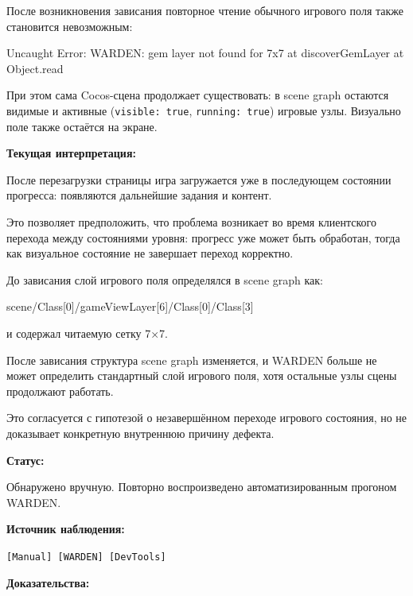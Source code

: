 \documentclass{ZGJournalArticle_2026}
\newenvironment{Shaded}{}{}
\newcommand{\NormalTok}[1]{#1}
\begin{document}
После возникновения зависания повторное чтение обычного игрового поля
также становится невозможным:

\begin{Shaded}
\begin{Highlighting}[]
\NormalTok{Uncaught Error: WARDEN: gem layer not found for 7x7}
\NormalTok{    at discoverGemLayer}
\NormalTok{    at Object.read}
\end{Highlighting}
\end{Shaded}

При этом сама Cocos-сцена продолжает существовать: в scene graph
остаются видимые и активные (\texttt{visible:\ true},
\texttt{running:\ true}) игровые узлы. Визуально поле также остаётся на
экране.

\textbf{Текущая интерпретация:}

После перезагрузки страницы игра загружается уже в последующем состоянии
прогресса: появляются дальнейшие задания и контент.

Это позволяет предположить, что проблема возникает во время клиентского
перехода между состояниями уровня: прогресс уже может быть обработан,
тогда как визуальное состояние не завершает переход корректно.

До зависания слой игрового поля определялся в scene graph как:

\begin{Shaded}
\begin{Highlighting}[]
\NormalTok{scene/Class[0]/gameViewLayer[6]/Class[0]/Class[3]}
\end{Highlighting}
\end{Shaded}

и содержал читаемую сетку 7×7.

После зависания структура scene graph изменяется, и WARDEN больше не
может определить стандартный слой игрового поля, хотя остальные узлы
сцены продолжают работать.

Это согласуется с гипотезой о незавершённом переходе игрового состояния,
но не доказывает конкретную внутреннюю причину дефекта.

\textbf{Статус:}

Обнаружено вручную. Повторно воспроизведено автоматизированным прогоном
WARDEN.

\textbf{Источник наблюдения:}

\texttt{{[}Manual{]}\ {[}WARDEN{]}\ {[}DevTools{]}}

\textbf{Доказательства:}
\end{document}
